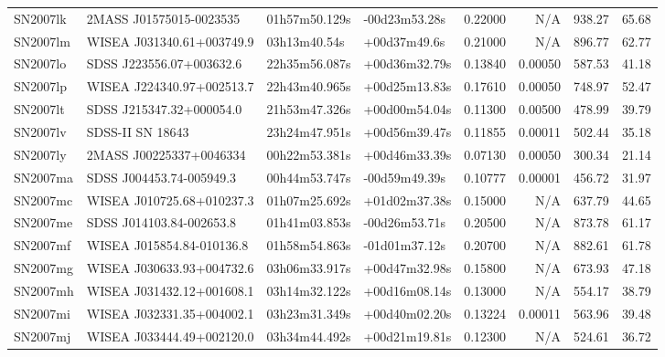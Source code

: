\begin{longtable}{llllrrrr}
SN2007lk         &         2MASS J01575015-0023535 &   01h57m50.129s &   -00d23m53.28s &  0.22000 &      N/A &   938.27 &       65.68 \\
SN2007lm         &       WISEA J031340.61+003749.9 &    03h13m40.54s &    +00d37m49.6s &  0.21000 &      N/A &   896.77 &       62.77 \\
SN2007lo         &        SDSS J223556.07+003632.6 &   22h35m56.087s &   +00d36m32.79s &  0.13840 &  0.00050 &   587.53 &       41.18 \\
SN2007lp         &       WISEA J224340.97+002513.7 &   22h43m40.965s &   +00d25m13.83s &  0.17610 &  0.00050 &   748.97 &       52.47 \\
SN2007lt         &        SDSS J215347.32+000054.0 &   21h53m47.326s &   +00d00m54.04s &  0.11300 &  0.00500 &   478.99 &       39.79 \\
SN2007lv         &                SDSS-II SN 18643 &   23h24m47.951s &   +00d56m39.47s &  0.11855 &  0.00011 &   502.44 &       35.18 \\
SN2007ly         &         2MASS J00225337+0046334 &   00h22m53.381s &   +00d46m33.39s &  0.07130 &  0.00050 &   300.34 &       21.14 \\
SN2007ma         &        SDSS J004453.74-005949.3 &   00h44m53.747s &   -00d59m49.39s &  0.10777 &  0.00001 &   456.72 &       31.97 \\
SN2007mc         &       WISEA J010725.68+010237.3 &   01h07m25.692s &   +01d02m37.38s &  0.15000 &      N/A &   637.79 &       44.65 \\
SN2007me         &        SDSS J014103.84-002653.8 &   01h41m03.853s &   -00d26m53.71s &  0.20500 &      N/A &   873.78 &       61.17 \\
SN2007mf         &       WISEA J015854.84-010136.8 &   01h58m54.863s &   -01d01m37.12s &  0.20700 &      N/A &   882.61 &       61.78 \\
SN2007mg         &       WISEA J030633.93+004732.6 &   03h06m33.917s &   +00d47m32.98s &  0.15800 &      N/A &   673.93 &       47.18 \\
SN2007mh         &       WISEA J031432.12+001608.1 &   03h14m32.122s &   +00d16m08.14s &  0.13000 &      N/A &   554.17 &       38.79 \\
SN2007mi         &       WISEA J032331.35+004002.1 &   03h23m31.349s &   +00d40m02.20s &  0.13224 &  0.00011 &   563.96 &       39.48 \\
SN2007mj         &       WISEA J033444.49+002120.0 &   03h34m44.492s &   +00d21m19.81s &  0.12300 &      N/A &   524.61 &       36.72 \\

\end{longtable}

